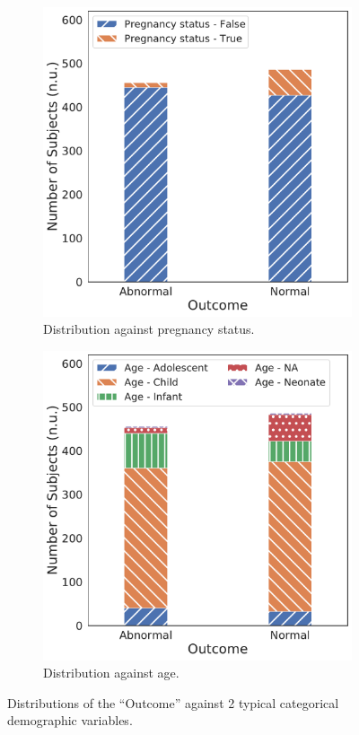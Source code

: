\begin{figure}[!htp]
\centering
\begin{subfigure}[t]{0.49\linewidth}
    \centering
    \includegraphics[width=\textwidth]{images/outcome_pregnancy_status_corr.pdf}
    \caption[]
    {Distribution against pregnancy status.}
    \label{fig:outcome_pregnancy_status_corr}
\end{subfigure}
\hfill
\begin{subfigure}[t]{0.49\linewidth}
    \centering
    \includegraphics[width=\textwidth]{images/outcome_age_corr.pdf}
    \caption[]
    {Distribution against age.}
    \label{fig:outcome_age_corr}
\end{subfigure}
\caption[]
{Distributions of the ``Outcome'' against 2 typical categorical demographic variables.}
\label{fig:outcome_corr}
\end{figure}
